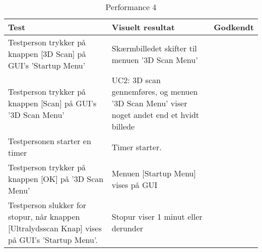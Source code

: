 \begin{table}[htb]
\begin{tabularx}{\textwidth}{|X|X|p{2cm}|}
\hline
\textbf{Test} & \textbf{Visuelt resultat} &\textbf{Godkendt}\\\hline
Testperson trykker på knappen [3D Scan] på GUI's 'Startup Menu' & Skærmbilledet skifter til menuen '3D Scan Menu' &  \\\hline
Testperson trykker på knappen [Scan] på GUI's '3D Scan Menu' & UC2: 3D scan gennemføres, og menuen '3D Scan Menu' viser noget andet end et hvidt billede & \\\hline
Testpersonen starter en timer & Timer starter. & \\\hline
Testperson trykker på knappen [OK] på '3D Scan Menu' & Menuen [Startup Menu] vises på GUI & \\\hline
Testperson slukker for stopur, når knappen [Ultralydsscan Knap] vises på GUI's 'Startup Menu'. & Stopur viser 1 minut eller derunder & \\\hline
\end{tabularx} 
\caption{Performance 4}
\label{P4}
\end{table}
\newpage